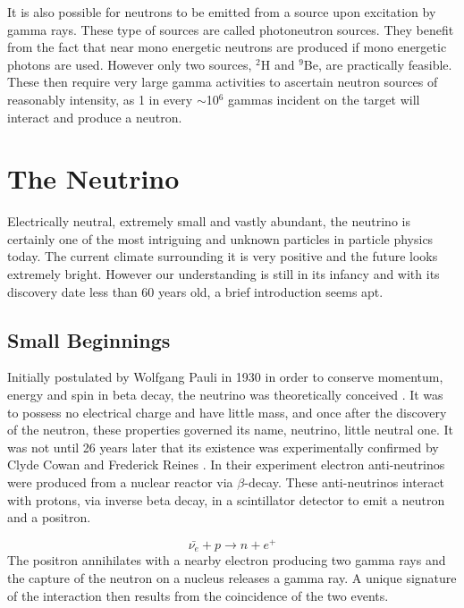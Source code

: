 It is also possible for neutrons to be emitted from a source upon excitation by gamma rays. These type of sources are called photoneutron sources. They benefit from the fact that near mono energetic neutrons are produced if mono energetic photons are used. However only two sources, $^{2}$H and $^{9}$Be, are practically feasible. These then require very large gamma activities to ascertain neutron sources of reasonably intensity, as 1 in every $\sim$10$^{6}$ gammas incident on the target will interact and produce a neutron.

\section{The Neutrino}
Electrically neutral, extremely small and vastly abundant, the neutrino is certainly one of the most intriguing and unknown particles in particle physics today. 
The current climate surrounding it is very positive and the future looks extremely bright. However our understanding is still in its infancy and with its discovery date less than 60 years old, a brief introduction seems apt.

\subsection{Small Beginnings}
Initially postulated by Wolfgang Pauli in 1930 in order to conserve momentum, energy and spin in beta decay, the neutrino was theoretically conceived \cite{BetaDecay}. It was to possess no electrical charge and have little mass, and once after the discovery of the neutron, these properties governed its name, neutrino, little neutral one. It was not until 26 years later that its existence was experimentally confirmed by Clyde Cowan and Frederick Reines \cite{Cowan}. In their experiment electron anti-neutrinos were produced from a nuclear reactor via $\beta$-decay. These anti-neutrinos interact with protons, via inverse beta decay, in a scintillator detector to emit a neutron and a positron. 

\begin{equation}
\bar{\nu_{e}} + p \to n + e^{+}
\end{equation}
The positron annihilates with a nearby electron producing two gamma rays and the capture of the neutron on a nucleus releases a gamma ray. A unique signature of the interaction then results from the coincidence of the two events.

